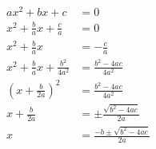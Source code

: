 \documentclass{scrartcl}
\begin{document}
\begin{align*}
  ax^2+bx+c &=0\\
  x^2+\frac b a x + \frac c a &=0\\
  x^2+\frac ba x &= -\frac ca\\
  x^2+\frac ba x +\frac {b^2} {4a^2} &= \frac {b^2 -4ac}{4a^2}\\
  \left(x+\frac b {2a}\right)^2 &= \frac {b^2 -4ac}{4a^2}\\
  x+\frac b {2a} &=\pm \frac{\sqrt {b^2-4ac}}{2a} \\
  x &=\frac{-b\pm \sqrt{b^2-4ac}}{2a}
\end{align*}
\end{document}
